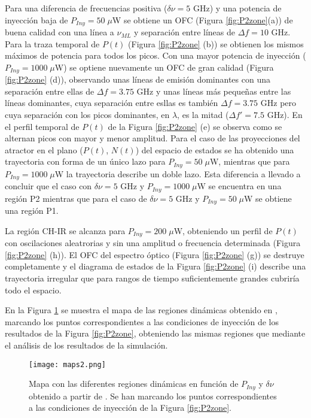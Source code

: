 			Para una diferencia de frecuencias positiva ($\delta \nu = 5$ GHz) y una potencia de inyecci\'on baja de $P_{Iny} = 50\;\mu$W se obtiene un OFC (Figura \ref{fig:P2zone}(a)) de buena calidad con una l\'inea a $\nu_{ML}$ y separaci\'on entre l\'ineas de $\Delta f = 10$ GHz. Para la traza temporal de $P(t)$ (Figura \ref{fig:P2zone} (b)) se obtienen los mismos m\'aximos de potencia para todos los picos. Con una mayor potencia de inyecci\'on ($P_{Iny} = 1000\;\mu$W) se optiene nuevamente un OFC de gran calidad (Figura \ref{fig:P2zone} (d)), observando unas l\'ineas de emisi\'on dominantes con una separaci\'on entre ellas de $\Delta f = 3.75$ GHz y unas l\'ineas m\'as pequeñas entre las l\'ineas dominantes, cuya separaci\'on entre esllas es tambi\'en $\Delta f = 3.75$ GHz pero cuya separaci\'on con los picos dominantes, en $\lambda$, es la mitad ($\Delta f' = 7.5$ GHz). En el perfil temporal de $P(t)$ de la Figura \ref{fig:P2zone} (e) se observa como se alternan picos con mayor y menor amplitud. Para el caso de las proyecciones del atractor en el plano ($P(t)$, $N(t)$) del espacio de estados se ha obtenido una trayectoria con forma de un \'unico lazo para $P_{Iny} = 50\;\mu$W, mientras que para $P_{Iny} = 1000\;\mu$W la trayectoria describe un doble lazo. Esta diferencia a llevado a concluir que el caso con $\delta\nu = 5$ GHz y $P_{Iny} = 1000\;\mu$W se encuentra en una regi\'on P2 mientras que para el caso de $\delta\nu = 5$ GHz y $P_{Iny} = 50\;\mu$W se obtiene una regi\'on P1.

		La región CH-IR se alcanza para $P_{Iny} = 200\;\mu$W, obteniendo un perfil de $P(t)$ con oscilaciones aleatrorias y sin una amplitud o frecuencia determinada (Figura \ref{fig:P2zone} (h)). El OFC del espectro óptico (Figura \ref{fig:P2zone} (g)) se destruye completamente y el diagrama de estados de la Figura \ref{fig:P2zone} (i) describe una trayectoria irregular que para rangos de tiempo suficientemente grandes cubriría todo el espacio. 

		En la Figura \ref{fig:maps2} se muestra el mapa de las regiones dinámicas obtenido en \cite{Chaves19}, marcando los puntos correspondientes a las condiciones de inyección de los resultados de la Figura \ref{fig:P2zone}, obteniendo las mismas regiones que mediante el análisis de los resultados de la simulación.

			\begin{figure}[H]
				\centering
				\texttt{[image: maps2.png]}
				\caption{\label{fig:maps2}Mapa con las diferentes regiones dinámicas en función de $P_{Iny}$ y $\delta\nu$ obtenido a partir de \cite{Chaves19}. Se han marcando los puntos correspondientes a las condiciones de inyección de la Figura \ref{fig:P2zone}.}	
			\end{figure}
